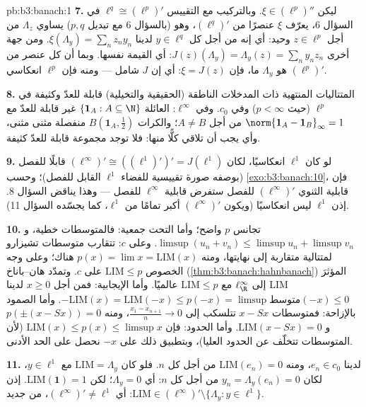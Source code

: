 \begin{solution}{pb:b3:banach:1}
\textbf{7.} ليكن $\xi \in (\ell^p)''$. وبالتركيب مع التقييس $\ell^q \cong (\ell^p)'$ في
السؤال 6، يعرّف $\xi$ عنصرًا من $(\ell^q)'$، وهو (بالسؤال 6 مع
تبديل $p, q$) يساوي $\Lambda_z$ من أجل $z \in \ell^p$ وحيد:
أي إنه من أجل كل $y \in \ell^q$ لدينا $\xi(\Lambda_y) = \sum_nz_ny_n$. ومن جهة أخرى
$J(z)(\Lambda_y) = \Lambda_y(z) = \sum_ny_nz_n$: أي القيمة نفسها. وبما أن كل عنصر من $(\ell^p)'$ هو
$\Lambda_y$ ما، فإن $\xi = J(z)$: أي إن $J$ شامل --- ومنه فإن
$\ell^p$ انعكاسي.

\textbf{8.} المتتاليات المنتهية ذات المدخلات الناطقة (الحقيقية
والتخيلية) قابلة للعدّ وكثيفة في $\ell^p$ (حيث $p < \infty$) وفي
$c_0$. وفي $\ell^\infty$: العائلة $\{\mathbf 1_A : A
\subseteq \N\}$ غير قابلة للعدّ مع $\norm{\mathbf 1_A -
\mathbf 1_B}_\infty = 1$
من أجل $A \neq B$؛ والكرات $B(\mathbf
1_A, \frac12)$ منفصلة مثنى مثنى، وأي  يجب أن تلاقي كلًّا منها: فلا توجد مجموعة قابلة للعدّ كثيفة.

\textbf{9.} لو كان $\ell^1$ انعكاسيًا، لكان $(\ell^\infty)'
\cong ((\ell^1)')' = J(\ell^1)$ قابلًا
للفصل (بوصفه صورة تقييسية للفضاء $\ell^1$ القابل للفصل)؛ وحسب
\cref{exo:b3:banach:10}، فإن قابلية الثنوي $(\ell^\infty)'$ للفصل ستفرض
قابلية $\ell^\infty$ للفصل --- وهذا يناقض السؤال 8. إذن
$\ell^1$ ليس انعكاسيًا (ويكون $(\ell^\infty)'$ أكبر تمامًا من
$\ell^1$، كما يجسّده السؤال 11).

\textbf{10.} تجانس $p$ واضح؛ وأما التحت جمعية: فالمتوسطات خطية،
و $\limsup(u_n + v_n) \leq \limsup u_n +
\limsup v_n$. وعلى $c$: تتقارب متوسطات تشيزارو لمتتالية متقاربة
إلى نهايتها، ومنه $p(x) = \lim x =
\mathrm{LIM}(x)$ هناك؛ وعلى وجه الخصوص $\mathrm{LIM} \leq p$ على
$c$. وتمدّد هان--باناخ (\cref{thm:b3:banach:hahnbanach}) المؤثرَ $\mathrm{LIM}$ إلى
$\ell^\infty_\R$ مع $\mathrm{LIM} \leq p$ عالميًا. وأما الإيجابية: فمن أجل
$x \geq 0$ لدينا $-\mathrm{LIM}(x) =
\mathrm{LIM}(-x) \leq p(-x) = \limsup\text{متوسط}(-x) \leq 0$. وأما الصمود بالإزاحة: فمتوسطات
$x - Sx$ تتلسكب إلى $\frac{x_1 - x_{n+1}}n \to 0$، ومنه $p(\pm(x - Sx)) = 0$ و $\mathrm{LIM}(x - Sx) = 0$. وأما
الحدود: فإن $\mathrm{LIM}(x) \leq p(x)
\leq \limsup x$ (لأن المتوسطات تتخلّف عن الحدود العليا)،
وبتطبيق ذلك على $-x$ نحصل على الحد الأدنى.

\textbf{11.} لدينا $e_n \in c_0$، ومنه $\mathrm{LIM}(e_n) = 0$ من أجل كل $n$.
فلو كان $\mathrm{LIM} = \Lambda_y$ مع $y \in \ell^1$، لكان $y_n = \Lambda_y(e_n) = 0$ من أجل كل $n$:
أي $\Lambda_y = 0$؛ لكن $\mathrm{LIM}(\mathbf 1) = 1$. إذن $\mathrm{LIM} \in
(\ell^\infty)' \setminus \{\Lambda_y : y \in \ell^1\}$: أي $(\ell^\infty)' \neq \ell^1$، من
جديد.


\end{solution}
